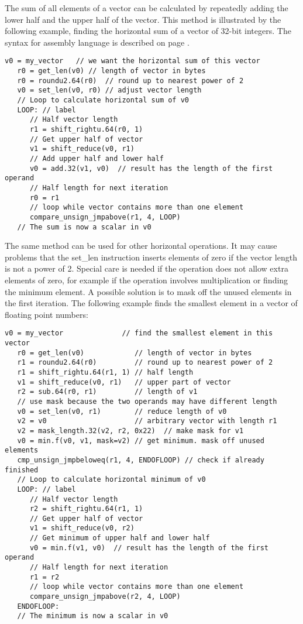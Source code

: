 \documentclass[forwardcom.tex]{subfiles}
\begin{document}
The sum of all elements of a vector can be calculated by repeatedly adding the lower half and the upper half of the vector. This method is illustrated by the following example, finding the horizontal sum of a vector of 32-bit integers. The syntax for assembly language is described on page \pageref{assemblySyntax}.

\begin{lstlisting}[frame=none]
   v0 = my_vector   // we want the horizontal sum of this vector
   r0 = get_len(v0) // length of vector in bytes
   r0 = roundu2.64(r0)  // round up to nearest power of 2
   v0 = set_len(v0, r0) // adjust vector length
   // Loop to calculate horizontal sum of v0
   LOOP: // label
      // Half vector length
      r1 = shift_rightu.64(r0, 1)
      // Get upper half of vector
      v1 = shift_reduce(v0, r1)
      // Add upper half and lower half
      v0 = add.32(v1, v0)  // result has the length of the first operand
      // Half length for next iteration
      r0 = r1
      // loop while vector contains more than one element
      compare_unsign_jmpabove(r1, 4, LOOP)      
   // The sum is now a scalar in v0
\end{lstlisting}

The same method can be used for other horizontal operations. It may cause problems that the set\_len instruction inserts elements of zero if the vector length is not a power of 2. Special care is needed if the operation does not allow extra elements of zero, for example if the operation involves multiplication or finding the minimum element. A possible solution is to mask off the unused elements in the first iteration. The following example finds the smallest element in a vector of floating point numbers:

\begin{lstlisting}[frame=none]
   v0 = my_vector              // find the smallest element in this vector
   r0 = get_len(v0)            // length of vector in bytes
   r1 = roundu2.64(r0)         // round up to nearest power of 2
   r1 = shift_rightu.64(r1, 1) // half length
   v1 = shift_reduce(v0, r1)   // upper part of vector
   r2 = sub.64(r0, r1)         // length of v1
   // use mask because the two operands may have different length
   v0 = set_len(v0, r1)        // reduce length of v0
   v2 = v0                     // arbitrary vector with length r1
   v2 = mask_length.32(v2, r2, 0x22)  // make mask for v1
   v0 = min.f(v0, v1, mask=v2) // get minimum. mask off unused elements
   cmp_unsign_jmpbeloweq(r1, 4, ENDOFLOOP) // check if already finished
   // Loop to calculate horizontal minimum of v0
   LOOP: // label
      // Half vector length
      r2 = shift_rightu.64(r1, 1)
      // Get upper half of vector
      v1 = shift_reduce(v0, r2)
      // Get minimum of upper half and lower half
      v0 = min.f(v1, v0)  // result has the length of the first operand
      // Half length for next iteration
      r1 = r2
      // loop while vector contains more than one element
      compare_unsign_jmpabove(r2, 4, LOOP)
   ENDOFLOOP:      
   // The minimum is now a scalar in v0
\end{lstlisting}
\end{document}
